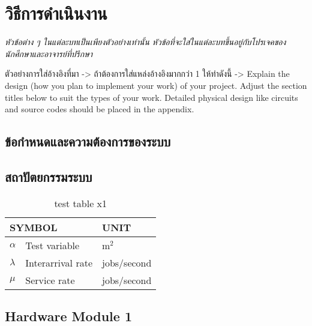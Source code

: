 \chapter{วิธีการดำเนินงาน}

\emph{หัวข้อต่าง ๆ ในแต่ละบทเป็นเพียงตัวอย่างเท่านั้น หัวข้อที่จะใส่ในแต่ละบทขึ้นอยู่กับโปรเจคของนักศึกษาและอาจารย์ที่ปรึกษา}


ตัวอย่างการใส่อ้างอิงที่มา -> \cite{hypersense} ถ้าต้องการใส่แหล่งอ้างอิงมากกว่า 1 ให้ทำดังนี้ -> \cite{hypersense,bworld}
Explain the design (how you plan to implement your work) of your project. Adjust the section titles below to suit the types of your work. Detailed physical design like circuits and source codes should be placed in the appendix.

\section{ข้อกำหนดและความต้องการของระบบ}

\section{สถาปัตยกรรมระบบ}

\begin{table}[!h]
    \centering
    \caption{test table x1}\label{tbl:symbols}
    \begin{tabular}{@{}p{}|p{}p{}}\hline
        \multicolumn{2}{l}{\textbf{SYMBOL}} & \textbf{UNIT}                         \\ \hline
        $\alpha$                            & Test variable\hfill     & m$^2$       \\
        $\lambda$                           & Interarrival rate\hfill & jobs/second \\
        $\mu$                               & Service rate\hfill      & jobs/second \\ \hline
    \end{tabular}
\end{table}



\section{Hardware Module 1}
